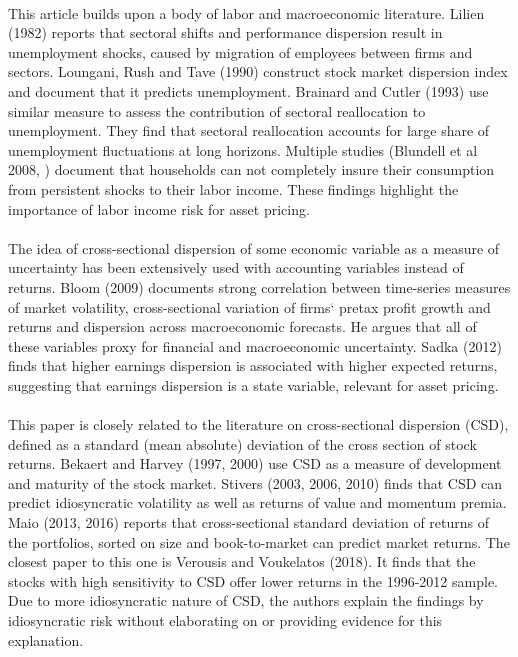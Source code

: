 \documentclass[12pt]{article}
\begin{document}
\paragraph{}
This article builds upon a body of labor and macroeconomic literature. Lilien (1982) reports that sectoral shifts and performance dispersion result in unemployment shocks, caused by migration of employees between firms and sectors. Loungani, Rush and Tave (1990) construct stock market dispersion index and document that it predicts unemployment. Brainard and Cutler (1993) use similar measure to assess the contribution of sectoral reallocation to unemployment. They find that sectoral reallocation accounts for large share of unemployment fluctuations at long horizons. Multiple studies (Blundell et al 2008, ) document that households can not completely insure their consumption from persistent shocks to their labor income. These findings highlight the importance of labor income risk for asset pricing.
\paragraph{}
The idea of cross-sectional dispersion of some economic variable as a measure of uncertainty has been extensively used with accounting variables instead of returns. Bloom (2009) documents strong correlation between time-series measures of market volatility, cross-sectional variation of firms` pretax profit growth and returns and dispersion across macroeconomic forecasts. He argues that all of these variables proxy for financial and macroeconomic uncertainty. Sadka (2012) finds that higher earnings dispersion is associated with higher expected returns, suggesting that earnings dispersion is a state variable, relevant for asset pricing.
\paragraph{}
This paper is closely related to the literature on cross-sectional dispersion (CSD), defined as a standard (mean absolute) deviation of the cross section of stock returns. Bekaert and Harvey (1997, 2000) use CSD as a measure of development and maturity of the stock market. Stivers (2003, 2006, 2010) finds that CSD can predict idiosyncratic volatility as well as returns of value and momentum premia. Maio (2013, 2016) reports that cross-sectional standard deviation of returns of the portfolios, sorted on size and book-to-market can predict market returns. The closest paper to this one is Verousis and Voukelatos (2018). It finds that the stocks with high sensitivity to CSD offer lower returns in the 1996-2012 sample. Due to more idiosyncratic nature of CSD, the authors explain the findings by idiosyncratic risk without elaborating on or providing evidence for this explanation.
\end{document}
